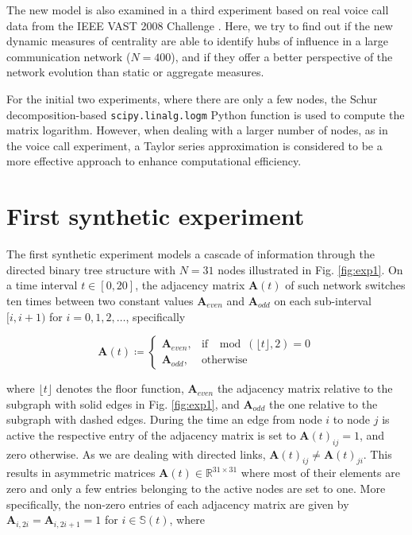The new model is also examined in a third experiment based on real voice call data from the IEEE VAST 2008 Challenge \cite{grinstein2008vast}. Here, we try to find out if the new dynamic measures of centrality are able to identify hubs of influence in a large communication network ($N=400$), and if they offer a better perspective of the network evolution than static or aggregate measures.

For the initial two experiments, where there are only a few nodes, the Schur decomposition-based \texttt{scipy.linalg.logm} Python function is used to compute the matrix logarithm. However, when dealing with a larger number of nodes, as in the voice call experiment, a Taylor series approximation is considered to be a more effective approach to enhance computational efficiency.

\section{First synthetic experiment}
\label{sec:synexp1}

The first synthetic experiment models a cascade of information through the directed binary tree structure with $N=31$ nodes illustrated in Fig. \ref{fig:exp1}. On a time interval $t \in [0,20]$, the adjacency matrix $\mathbf{A}(t)$ of such network switches ten times between two constant values $\mathbf{A}_{even}$ and $\mathbf{A}_{odd}$ on each sub-interval $[i, i + 1)$ for $i=0,1,2,\dots$, specifically

\begin{equation*}
\mathbf{A}(t)\coloneqq
    \begin{cases}
        \mathbf{A}_{even}, & \text{if } \mod(\lfloor t \rfloor, 2) = 0\\
        \mathbf{A}_{odd}, & \text{otherwise} 
    \end{cases}
\end{equation*}

where $\lfloor t \rfloor$ denotes the floor function, $\mathbf{A}_{even}$ the adjacency matrix relative to the subgraph with solid edges in Fig. \ref{fig:exp1}, and $\mathbf{A}_{odd}$ the one relative to the subgraph with dashed edges. During the time an edge from node $i$ to node $j$ is active the respective entry of the adjacency matrix is set to $\mathbf{A}(t)_{ij}=1$, and zero otherwise. As we are dealing with directed links, $\mathbf{A}(t)_{ij}\ne \mathbf{A}(t)_{ji}$. This results in asymmetric matrices $\mathbf{A}(t)\in \mathbb{R}^{31\times 31}$ where most of their elements are zero and only a few entries belonging to the active nodes are set to one. More specifically, the non-zero entries of each adjacency matrix are given by $\mathbf{A}_{i,2i} = \mathbf{A}_{i,2i+1} = 1$ for $i \in \mathbb{S}(t)$, where 

